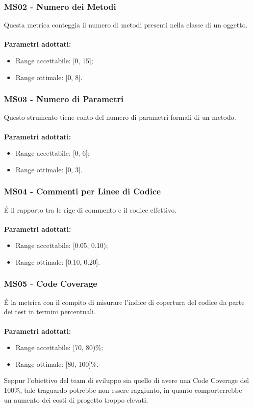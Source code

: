 \subsubsection{MS02 - Numero dei Metodi}
Questa metrica conteggia il numero di metodi presenti nella classe di un oggetto.\\ \\ 
\textbf{Parametri adottati:} 
\begin{itemize}
\item Range accettabile: [0, 15];
\item Range ottimale: [0, 8].
\end{itemize}
\subsubsection{MS03 - Numero di Parametri}
Questo strumento tiene conto del numero di parametri formali di un metodo.\\ \\ 
\textbf{Parametri adottati:} 
\begin{itemize}
\item Range accettabile: [0, 6];
\item Range ottimale: [0, 3].
\end{itemize}
\subsubsection{MS04 - Commenti per Linee di Codice}
\'E il rapporto tra le rige di commento e il codice effettivo.\\ \\ 
\textbf{Parametri adottati:} 
\begin{itemize}
\item Range accettabile: [0.05, 0.10);
\item Range ottimale: [0.10, 0.20].
\end{itemize}
\subsubsection{MS05 - Code Coverage}
\'E la metrica con il compito di misurare l'indice di copertura del codice da parte dei test in termini percentuali.\\ \\ 
\textbf{Parametri adottati:} 
\begin{itemize}
\item Range accettabile: [70, 80)\%;
\item Range ottimale: [80, 100]\%.
\end{itemize}
Seppur l'obiettivo del team di sviluppo sia quello di avere una Code Coverage del 100\%, tale traguardo potrebbe non essere raggiunto, in quanto comporterrebbe un aumento dei costi di progetto troppo elevati.